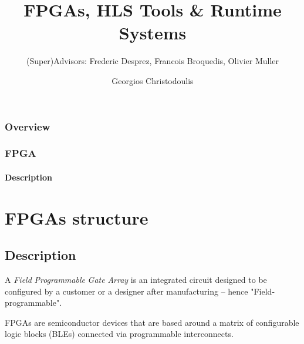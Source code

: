 \documentclass{beamer}
\title[George Christodoulis]{FPGAs, HLS Tools \& Runtime Systems} %
\subtitle{{\fontsize{8}{6}\selectfont (Super)Advisors: Frederic Desprez, Francois Broquedis, Olivier Muller}}
\author{Georgios Christodoulis} %
\institute[NTUA] %
{
CORSE$-$LIG\\ %
\medskip
\textit{gchristodoulis@gmail.com} %
}
\date{}
\begin{document}
\begin{frame}
\titlepage %
\end{frame}

\begin{frame}
\frametitle{Overview} %
\tableofcontents %
\end{frame}
\begin{frame}
\frametitle{FPGA}
\framesubtitle{Description}
\section{FPGAs structure}
\subsection{Description}

\par{A \emph{\alert{F}ield} \emph{\alert{P}rogrammable} \emph{\alert{G}ate} \emph{\alert{A}rray} is an integrated circuit designed to be configured by a customer or a designer after manufacturing – hence "Field-programmable".}

\par{\alert{FPGA}s are semiconductor devices that are based around a matrix of configurable logic blocks (BLEs) connected via programmable interconnects.}

\end{frame}
\end{document}
